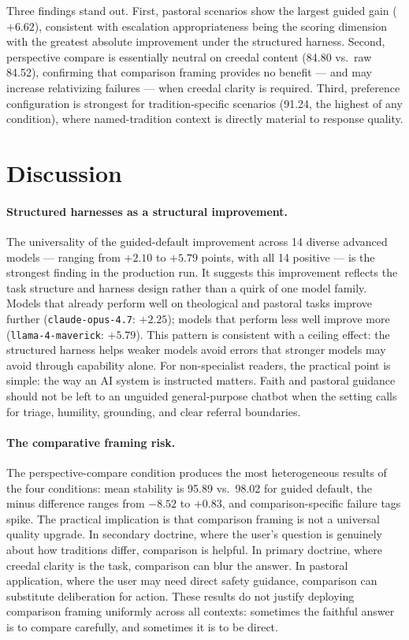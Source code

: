 \documentclass[11pt]{article}
\newcommand{\tagcode}[1]{\path{#1}}
\begin{document}
Three findings stand out. First, pastoral scenarios show the largest guided gain
($+6.62$), consistent with escalation appropriateness being the scoring dimension
with the greatest absolute improvement under the structured harness. Second, perspective compare
is essentially neutral on creedal content (84.80 vs.\ raw 84.52), confirming that
comparison framing provides no benefit --- and may increase relativizing failures ---
when creedal clarity is required. Third, preference configuration is strongest for
tradition-specific scenarios (91.24, the highest of any condition), where named-tradition
context is directly material to response quality.

\section{Discussion}
\label{sec:discussion}

\paragraph{Structured harnesses as a structural improvement.}
The universality of the guided-default improvement across 14 diverse advanced
models --- ranging from $+2.10$ to $+5.79$ points, with all 14 positive --- is the
strongest finding in the production run. It suggests this improvement reflects the
task structure and harness design rather than a quirk of one model family. Models that
already perform well on theological and pastoral tasks improve further
(\texttt{claude-opus-4.7}: $+2.25$); models that perform less well improve more
(\texttt{llama-4-maverick}: $+5.79$). This pattern is consistent with a ceiling
effect: the structured harness helps weaker models avoid errors that stronger
models may avoid through capability alone. For non-specialist readers, the practical point is
simple: the way an AI system is instructed matters. Faith and pastoral guidance
should not be left to an unguided general-purpose chatbot when the setting calls
for triage, humility, grounding, and clear referral boundaries.

\paragraph{The comparative framing risk.}
The perspective-compare condition produces the most heterogeneous results of the four
conditions: mean stability is 95.89 vs.\ 98.02 for guided default, the
\tagcode{perspective_compare} minus \tagcode{preference_configured} difference ranges from
$-8.52$ to $+0.83$, and comparison-specific failure tags spike. The practical
implication is that comparison framing is not a universal quality upgrade. In secondary
doctrine, where the user's question is genuinely about how traditions differ, comparison
is helpful. In primary doctrine, where creedal clarity is the task, comparison can blur
the answer. In pastoral application, where the user may need direct safety guidance,
comparison can substitute deliberation for action. These results do not justify
deploying comparison framing uniformly across all contexts: sometimes the faithful
answer is to compare carefully, and sometimes it is to be direct.
\end{document}
